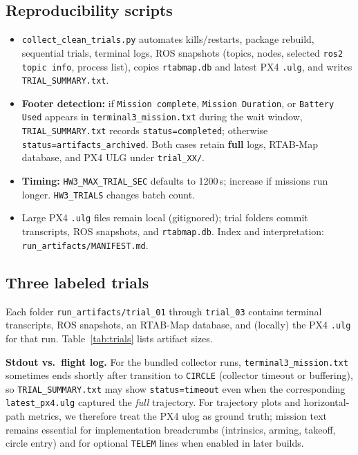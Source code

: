 \documentclass[11pt]{article}
\begin{document}
\subsection{Reproducibility scripts}
\begin{itemize}[itemsep=2pt]
    \item \texttt{collect\_clean\_trials.py} automates kills/restarts, package rebuild, sequential trials, terminal logs, ROS snapshots (topics, nodes, selected \texttt{ros2 topic info}, process list), copies \texttt{rtabmap.db} and latest PX4 \texttt{.ulg}, and writes \texttt{TRIAL\_SUMMARY.txt}.
    \item \textbf{Footer detection:} if \texttt{Mission complete}, \texttt{Mission Duration}, or \texttt{Battery Used} appears in \texttt{terminal3\_mission.txt} during the wait window, \texttt{TRIAL\_SUMMARY.txt} records \texttt{status=completed}; otherwise \texttt{status=artifacts\_archived}. Both cases retain \textbf{full} logs, RTAB-Map database, and PX4 ULG under \texttt{trial\_XX/}.
    \item \textbf{Timing:} \texttt{HW3\_MAX\_TRIAL\_SEC} defaults to \num{1200}\,s; increase if missions run longer. \texttt{HW3\_TRIALS} changes batch count.
    \item Large PX4 \texttt{.ulg} files remain local (gitignored); trial folders commit transcripts, ROS snapshots, and \texttt{rtabmap.db}. Index and interpretation: \texttt{run\_artifacts/MANIFEST.md}.
\end{itemize}

\subsection{Three labeled trials}
Each folder \texttt{run\_artifacts/trial\_01} through \texttt{trial\_03} contains terminal transcripts, ROS snapshots, an RTAB-Map database, and (locally) the PX4 \texttt{.ulg} for that run. Table~\ref{tab:trials} lists artifact sizes.

\textbf{Stdout vs.\ flight log.} For the bundled collector runs, \texttt{terminal3\_mission.txt} sometimes ends shortly after transition to \texttt{CIRCLE} (collector timeout or buffering), so \texttt{TRIAL\_SUMMARY.txt} may show \texttt{status=timeout} even when the corresponding \texttt{latest\_px4.ulg} captured the \emph{full} trajectory. For trajectory plots and horizontal-path metrics, we therefore treat the PX4 ulog as ground truth; mission text remains essential for implementation breadcrumbs (intrinsics, arming, takeoff, circle entry) and for optional \texttt{TELEM} lines when enabled in later builds.
\end{document}
